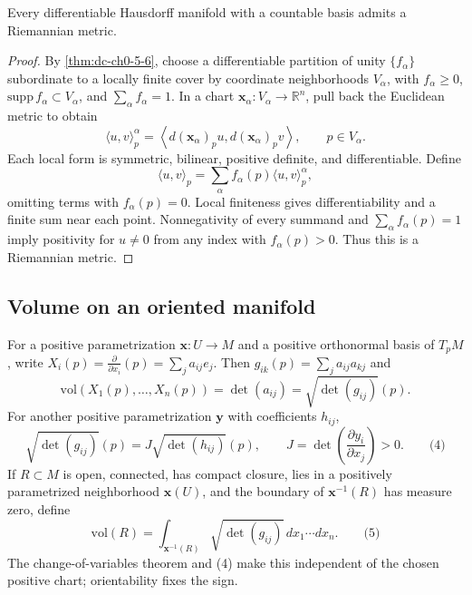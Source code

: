 \begin{proposition}
  \label{prop:dc-ch1-2-10}
  \leanok
  Every differentiable Hausdorff manifold with a countable basis admits a
  Riemannian metric.
\end{proposition}
\begin{proof}
  \leanok
  \sketch
  By \cref{thm:dc-ch0-5-6}, choose a differentiable partition of unity
  $\{f_\alpha\}$ subordinate to a locally finite cover by coordinate neighborhoods
  $V_\alpha$, with $f_\alpha\ge0$, $\mathrm{supp}\,f_\alpha\subset V_\alpha$,
  and $\sum_\alpha f_\alpha=1$. In a chart
  $\mathbf{x}_\alpha:V_\alpha\to\mathbb{R}^n$, pull back the Euclidean metric to
  obtain
  $$
  \langle u,v\rangle_p^\alpha=
  \left\langle d(\mathbf{x}_\alpha)_p u,d(\mathbf{x}_\alpha)_p v\right\rangle,
  \qquad p\in V_\alpha.
  $$
  Each local form is symmetric, bilinear, positive definite, and differentiable.
  Define
  $$
  \langle u,v\rangle_p=\sum_\alpha f_\alpha(p)\langle u,v\rangle_p^\alpha,
  $$
  omitting terms with $f_\alpha(p)=0$. Local finiteness gives differentiability and
  a finite sum near each point. Nonnegativity of every summand and
  $\sum_\alpha f_\alpha(p)=1$ imply positivity for $u\ne0$ from any index with
  $f_\alpha(p)>0$. Thus this is a Riemannian metric.
\end{proof}

\subsection{Volume on an oriented manifold}

For a positive parametrization $\mathbf{x}:U\to M$ and a positive orthonormal
basis of $T_pM$, write
$X_i(p)=\frac{\partial}{\partial x_i}(p)=\sum_j a_{ij}e_j$. Then
$g_{ik}(p)=\sum_j a_{ij}a_{kj}$ and
$$
\mathrm{vol}(X_1(p),\ldots,X_n(p))=\det(a_{ij})=\sqrt{\det(g_{ij})}(p).
$$
For another positive parametrization $\mathbf{y}$ with coefficients $h_{ij}$,
$$
\sqrt{\det(g_{ij})}(p)=J\sqrt{\det(h_{ij})}(p),\qquad
J=\det\left(\frac{\partial y_i}{\partial x_j}\right)>0.\qquad\text{(4)}
$$
If $R\subset M$ is open, connected, has compact closure, lies in a positively
parametrized neighborhood $\mathbf{x}(U)$, and the boundary of
$\mathbf{x}^{-1}(R)$ has measure zero, define
$$
\mathrm{vol}(R)=\int_{\mathbf{x}^{-1}(R)}\sqrt{\det(g_{ij})}\,dx_1\cdots dx_n.\qquad\text{(5)}
$$
The change-of-variables theorem and (4) make this independent of the chosen
positive chart; orientability fixes the sign.

